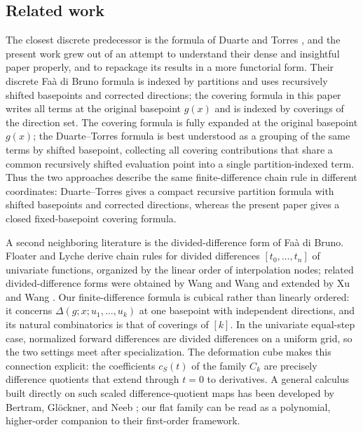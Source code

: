 \documentclass[10pt,a4paper]{article}
\theoremstyle{plain}
\theoremstyle{definition}
\newcommand{\1}{\mathbb{1}} %
\begin{document}
\subsection{Related work}\label{related-work}

The closest discrete predecessor is the formula of Duarte and Torres
\citep{DT2008}, and the present work grew out of an attempt to
understand their dense and insightful paper properly, and to repackage
its results in a more functorial form. Their discrete Faà di Bruno
formula is indexed by partitions and uses recursively shifted basepoints
and corrected directions; the covering formula in this paper writes all
terms at the original basepoint \(g(x)\) and is indexed by coverings of
the direction set. The covering formula is fully expanded at the
original basepoint \(g(x)\); the Duarte--Torres formula is best
understood as a grouping of the same terms by shifted basepoint,
collecting all covering contributions that share a common recursively
shifted evaluation point into a single partition-indexed term. Thus the
two approaches describe the same finite-difference chain rule in
different coordinates: Duarte--Torres gives a compact recursive
partition formula with shifted basepoints and corrected directions,
whereas the present paper gives a closed fixed-basepoint covering
formula.

A second neighboring literature is the divided-difference form of Faà di
Bruno. Floater and Lyche \citep{FL2007} derive chain rules for divided
differences \([t_0, \dots, t_n]\) of univariate functions, organized by
the linear order of interpolation nodes; related divided-difference
forms were obtained by Wang and Wang \citep{WW2006} and extended by Xu
and Wang \citep{XW2010}. Our finite-difference formula is cubical rather
than linearly ordered: it concerns \(\Delta(g; x; u_1, \dots, u_k)\) at
one basepoint with independent directions, and its natural combinatorics
is that of coverings of \([k]\). In the univariate equal-step case,
normalized forward differences are divided differences on a uniform
grid, so the two settings meet after specialization. The deformation
cube makes this connection explicit: the coefficients \(c_S(t)\) of the
family \(C_k\) are precisely difference quotients that extend through
\(t = 0\) to derivatives. A general calculus built directly on such
scaled difference-quotient maps has been developed by Bertram, Glöckner,
and Neeb \citep{BGN2004}; our flat family can be read as a polynomial,
higher-order companion to their first-order framework.
\end{document}
